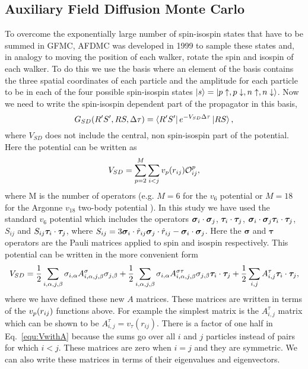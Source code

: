 \subsection{Auxiliary Field Diffusion Monte Carlo}
\label{sec:AFDMC}
To overcome the exponentially large number of spin-isospin states that have to be summed in GFMC, AFDMC was developed in 1999 \cite{schmidt1999} to sample these states and, in analogy to moving the position of each walker, rotate the spin and isospin of each walker. To do this we use the basis where an element of the basis contains the three spatial coordinates of each particle and the amplitude for each particle to be in each of the four possible spin-isospin states $\left| s \right> = \left| p\uparrow,p\downarrow,n\uparrow,n\downarrow \right>$. Now we need to write the spin-isospin dependent part of the propagator in this basis,
\begin{equation}
   G_{SD}(R'S',RS,\Delta\tau) = \left< R'S' \right|e^{-V_{SD}\Delta\tau} \left| RS \right>,
\end{equation}
where $V_{SD}$ does not include the central, non spin-isospin part of the potential. Here the potential can be written as
\begin{equation}
   V_{SD} = \sum\limits_{p=2}^{M}\sum\limits_{i<j} v_p(r_{ij})\mathcal{O}_{ij}^p,
\end{equation}
where M is the number of operators (e.g. $M=6$ for the $v_6$ potential or $M=18$ for the Argonne $v_{18}$ two-body potential \cite{wiringa1984}). In this study we have used the standard $v_6$ potential which includes the operators $\bm{\sigma}_i\cdot\bm{\sigma}_j$, $\bm{\tau}_i\cdot\bm{\tau}_j$, $\bm{\sigma}_i\cdot\bm{\sigma}_j \bm{\tau}_i\cdot\bm{\tau}_j$, $S_{ij}$ and $S_{ij} \bm{\tau}_i\cdot\bm{\tau}_j$, where $S_{ij} = 3\bm{\sigma}_i\cdot\hat{r}_{ij}\bm{\sigma}_j\cdot\hat{r}_{ij}-\bm{\sigma}_i\cdot\bm{\sigma}_j$. Here the $\mathbf{\sigma}$ and $\mathbf{\tau}$ operators are the Pauli matrices applied to spin and isospin respectively. This potential can be written in the more convenient form
\begin{equation}
   V_{SD} = \frac{1}{2}\sum\limits_{i,\alpha,j,\beta} \sigma_{i,\alpha}A^{\sigma}_{i,\alpha,j,\beta}\sigma_{j,\beta}
      + \frac{1}{2}\sum\limits_{i,\alpha,j,\beta} \sigma_{i,\alpha}A^{\sigma\tau}_{i,\alpha,j,\beta}\sigma_{j,\beta}\bm{\tau}_i\cdot\bm{\tau}_j
      + \frac{1}{2}\sum\limits_{i,j} A^{\tau}_{i,j}\bm{\tau}_i\cdot\bm{\tau}_j,
   \label{equ:VwithA}
\end{equation}
where we have defined these new $A$ matrices. These matrices are written in terms of the $v_p(r_{ij})$ functions above. For example the simplest matrix is the $A^{\tau}_{i,j}$ matrix which can be shown to be $A^{\tau}_{i,j} = v_{\tau}(r_{ij})$. There is a factor of one half in Eq.~\ref{equ:VwithA} because the sums go over all $i$ and $j$ particles instead of pairs for which $i<j$. These matrices are zero when $i=j$ and they are symmetric. We can also write these matrices in terms of their eigenvalues and eigenvectors.
